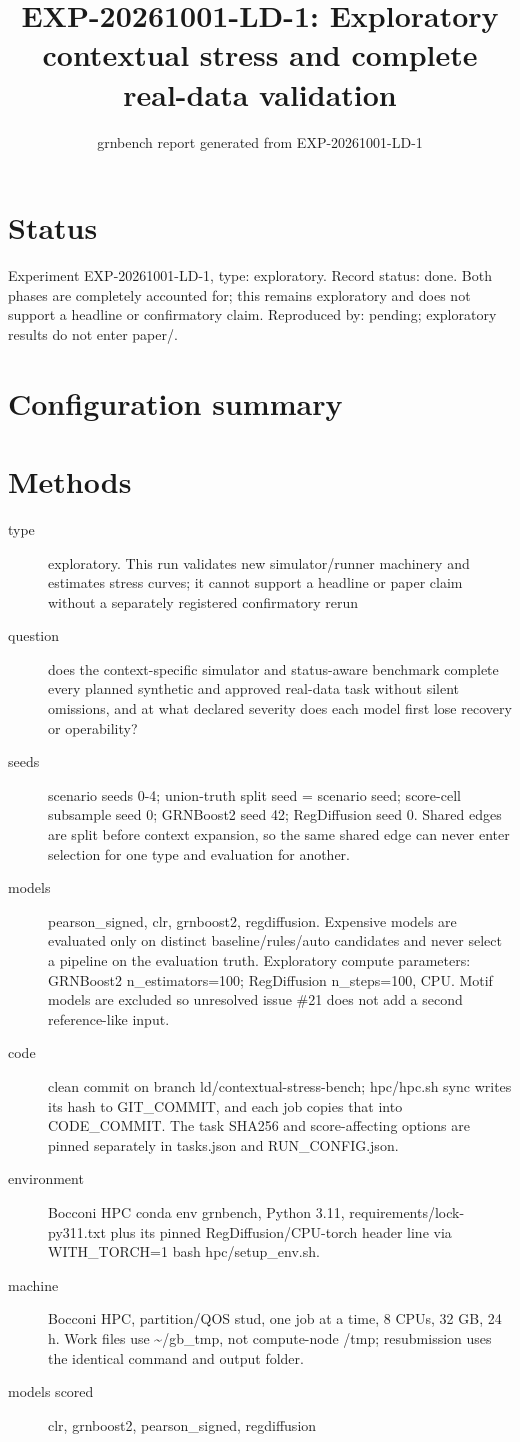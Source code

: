 \documentclass{article}
\title{EXP-20261001-LD-1: Exploratory contextual stress and complete real-data validation}
\author{grnbench report generated from EXP-20261001-LD-1}
\date{}
\begin{document}
\maketitle
\section*{Status}
Experiment EXP-20261001-LD-1, type: exploratory. Record status: done. Both phases are completely accounted for; this remains exploratory and does not support a headline or confirmatory claim. Reproduced by: pending; exploratory results do not enter paper/.
\section{Configuration summary}

\section{Methods}
\begin{description}
\item[type] exploratory. This run validates new simulator/runner machinery and estimates stress curves; it cannot support a headline or paper claim without a separately registered confirmatory rerun
\item[question] does the context-specific simulator and status-aware benchmark complete every planned synthetic and approved real-data task without silent omissions, and at what declared severity does each model first lose recovery or operability?
\item[seeds] scenario seeds 0-4; union-truth split seed = scenario seed; score-cell subsample seed 0; GRNBoost2 seed 42; RegDiffusion seed 0. Shared edges are split before context expansion, so the same shared edge can never enter selection for one type and evaluation for another.
\item[models] pearson\_signed, clr, grnboost2, regdiffusion. Expensive models are evaluated only on distinct baseline/rules/auto candidates and never select a pipeline on the evaluation truth. Exploratory compute parameters: GRNBoost2 n\_estimators=100; RegDiffusion n\_steps=100, CPU. Motif models are excluded so unresolved issue \#21 does not add a second reference-like input.
\item[code] clean commit on branch ld/contextual-stress-bench; hpc/hpc.sh sync writes its hash to GIT\_COMMIT, and each job copies that into CODE\_COMMIT. The task SHA256 and score-affecting options are pinned separately in tasks.json and RUN\_CONFIG.json.
\item[environment] Bocconi HPC conda env grnbench, Python 3.11, requirements/lock-py311.txt plus its pinned RegDiffusion/CPU-torch header line via WITH\_TORCH=1 bash hpc/setup\_env.sh.
\item[machine] Bocconi HPC, partition/QOS stud, one job at a time, 8 CPUs, 32 GB, 24 h. Work files use \textasciitilde{}/gb\_tmp, not compute-node /tmp; resubmission uses the identical command and output folder.
\item[models scored] clr, grnboost2, pearson\_signed, regdiffusion
\end{description}
\end{document}

